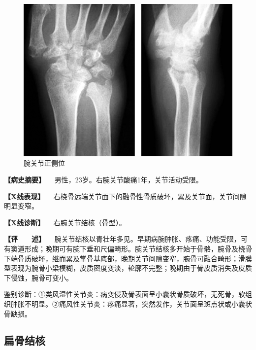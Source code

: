 \begin{figure}[!htbp]
 \centering
 \includegraphics{./images/Image00084.jpg}
 \captionsetup{justification=centering}
 \caption{腕关节正侧位}
 \label{fig2-6-9}
  \end{figure} 

\textbf{【病史摘要】} 　男性，23岁。右腕关节酸痛1年，关节活动受限。

\textbf{【X线表现】}
　右桡骨远端关节面下的融骨性骨质破坏，累及关节面，关节间隙明显变窄。

\textbf{【X线诊断】} 　右腕关节结核（骨型）。

\textbf{【评　　述】}
　腕关节结核以青壮年多见。早期病腕肿胀、疼痛、功能受限，可有窦道形成；晚期可有腕下垂和尺偏畸形。腕关节结核多开始于骨骼，腕骨及桡骨下端骨质破坏，继而累及掌骨基底部，晚期关节间隙变窄，腕骨可融合畸形；滑膜型表现为腕骨小梁模糊，皮质密度变淡，轮廓不完整；晚期由于骨皮质消失及皮质下侵蚀，腕骨可变小。

鉴别诊断：①类风湿性关节炎：病变侵及骨表面呈小囊状骨质破坏，无死骨，软组织肿胀不明显。②痛风性关节炎：疼痛显著，突然发作，关节面呈斑点状或小囊状骨缺损。

\subsection{扁骨结核}

